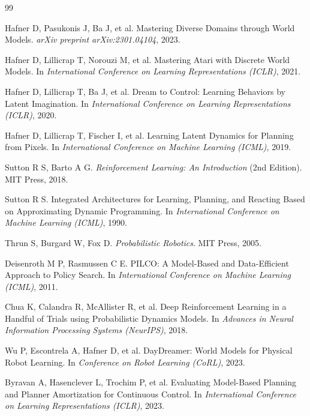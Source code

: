 \documentclass[12pt,a4paper]{ctexart}
\begin{document}
\begin{thebibliography}{99}

Hafner D, Pasukonis J, Ba J, et al.
\newblock Mastering Diverse Domains through World Models.
\newblock \textit{arXiv preprint arXiv:2301.04104}, 2023.

Hafner D, Lillicrap T, Norouzi M, et al.
\newblock Mastering Atari with Discrete World Models.
\newblock In \textit{International Conference on Learning Representations (ICLR)}, 2021.

Hafner D, Lillicrap T, Ba J, et al.
\newblock Dream to Control: Learning Behaviors by Latent Imagination.
\newblock In \textit{International Conference on Learning Representations (ICLR)}, 2020.

Hafner D, Lillicrap T, Fischer I, et al.
\newblock Learning Latent Dynamics for Planning from Pixels.
\newblock In \textit{International Conference on Machine Learning (ICML)}, 2019.

Sutton R S, Barto A G.
\newblock \textit{Reinforcement Learning: An Introduction} (2nd Edition).
\newblock MIT Press, 2018.

Sutton R S.
\newblock Integrated Architectures for Learning, Planning, and Reacting Based on Approximating Dynamic Programming.
\newblock In \textit{International Conference on Machine Learning (ICML)}, 1990.

Thrun S, Burgard W, Fox D.
\newblock \textit{Probabilistic Robotics}.
\newblock MIT Press, 2005.

Deisenroth M P, Rasmussen C E.
\newblock PILCO: A Model-Based and Data-Efficient Approach to Policy Search.
\newblock In \textit{International Conference on Machine Learning (ICML)}, 2011.

Chua K, Calandra R, McAllister R, et al.
\newblock Deep Reinforcement Learning in a Handful of Trials using Probabilistic Dynamics Models.
\newblock In \textit{Advances in Neural Information Processing Systems (NeurIPS)}, 2018.

Wu P, Escontrela A, Hafner D, et al.
\newblock DayDreamer: World Models for Physical Robot Learning.
\newblock In \textit{Conference on Robot Learning (CoRL)}, 2023.

Byravan A, Hasenclever L, Trochim P, et al.
\newblock Evaluating Model-Based Planning and Planner Amortization for Continuous Control.
\newblock In \textit{International Conference on Learning Representations (ICLR)}, 2023.


\end{thebibliography}
\end{document}
